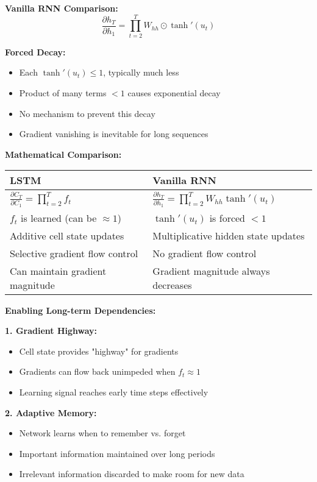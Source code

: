 \documentclass[12pt]{article}
\begin{document}
\begin{enumerate}[(a)]
{    \textbf{Vanilla RNN Comparison:}
    $$\frac{\partial h_T}{\partial h_1} = \prod_{t=2}^T W_{hh} \odot \tanh'(u_t)$$
    
    \textbf{Forced Decay:}
    \begin{itemize}
        \item Each $\tanh'(u_t) \leq 1$, typically much less
        \item Product of many terms $< 1$ causes exponential decay
        \item No mechanism to prevent this decay
        \item Gradient vanishing is inevitable for long sequences
    \end{itemize}
    
    \textbf{Mathematical Comparison:}
    
    \begin{tabular}{|p{5.5cm}|p{5.5cm}|}
    \hline
    \textbf{LSTM} & \textbf{Vanilla RNN} \\
    \hline
    $\frac{\partial C_T}{\partial C_1} = \prod_{t=2}^T f_t$ & $\frac{\partial h_T}{\partial h_1} = \prod_{t=2}^T W_{hh} \tanh'(u_t)$ \\
    \hline
    $f_t$ is learned (can be $\approx 1$) & $\tanh'(u_t)$ is forced $< 1$ \\
    \hline
    Additive cell state updates & Multiplicative hidden state updates \\
    \hline
    Selective gradient flow control & No gradient flow control \\
    \hline
    Can maintain gradient magnitude & Gradient magnitude always decreases \\
    \hline
    \end{tabular}
    
    \textbf{Enabling Long-term Dependencies:}
    
    \textbf{1. Gradient Highway:}
    \begin{itemize}
        \item Cell state provides "highway" for gradients
        \item Gradients can flow back unimpeded when $f_t \approx 1$
        \item Learning signal reaches early time steps effectively
    \end{itemize}
    
    \textbf{2. Adaptive Memory:}
    \begin{itemize}
        \item Network learns when to remember vs. forget
        \item Important information maintained over long periods
        \item Irrelevant information discarded to make room for new data
    \end{itemize}
    
}
\end{enumerate}
\end{document}
